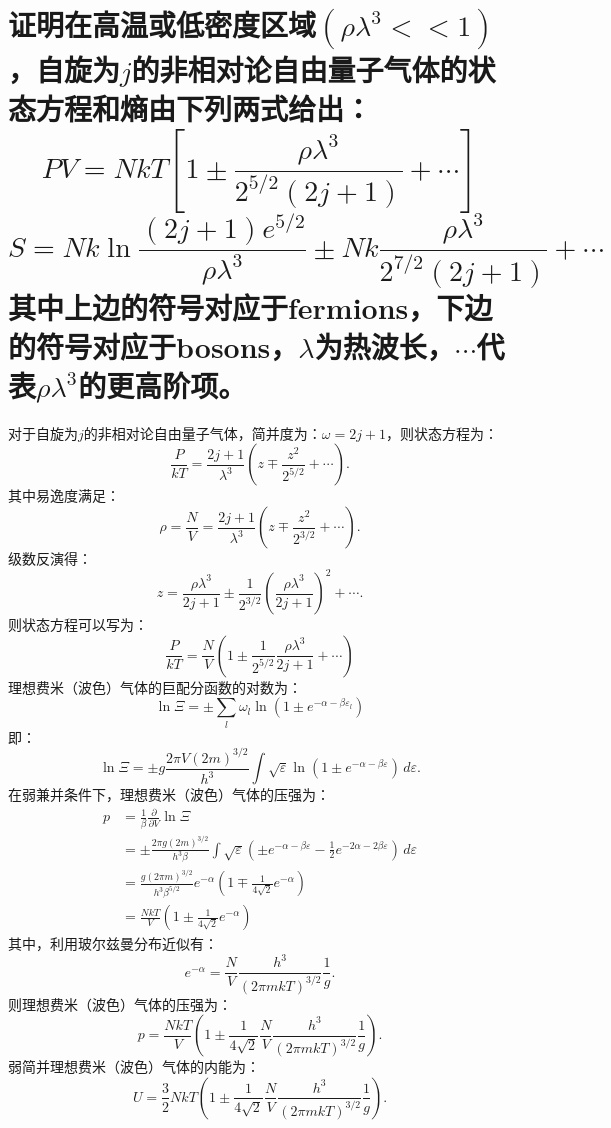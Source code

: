 \documentclass[reqno,a4paper,12pt]{amsart}
\begin{document}
\section{证明在高温或低密度区域$(\rho\lambda^3 << 1)$，自旋为$j$的非相对论自由量子气体的状态方程和熵由下列两式给出：
\[
	PV = NkT\left[1 \pm \frac{\rho\lambda^3}{2^{5/2}(2j+1)} + \cdots \right]
\]
\[
	S = Nk\ln\frac{(2j+1)e^{5/2}}{\rho\lambda^3}\pm Nk\frac{\rho\lambda^3}{2^{7/2}(2j+1)} + \cdots
\]
其中上边的符号对应于fermions，下边的符号对应于bosons，$\lambda$为热波长，$\cdots$代表$\rho\lambda^3$的更高阶项。
}
\begin{tcolorbox}[breakable, colback = black!5!white, colframe = black]
对于自旋为$j$的非相对论自由量子气体，简并度为：$\omega = 2j+1$，则状态方程为：
\[
	\frac{P}{kT} = \frac{2j+1}{\lambda^3}\left( z \mp \frac{z^2}{2^{5/2}} + \cdots \right).
\]
其中易逸度满足：
\[
	\rho = \frac{N}{V} = \frac{2j+1}{\lambda^3}\left( z \mp \frac{z^2}{2^{3/2}} + \cdots \right).
\]
级数反演得：
\[
	z = \frac{\rho\lambda^3}{2j+1} \pm \frac{1}{2^{3/2}} \left( \frac{\rho\lambda^3}{2j+1} \right)^2 + \cdots.
\]
则状态方程可以写为：
\[
	\frac{P}{kT} = \frac{N}{V} \left( 1 \pm \frac{1}{2^{5/2}}\frac{\rho\lambda^3}{2j+1} + \cdots \right)
\]
理想费米（波色）气体的巨配分函数的对数为：
\[
	\ln \Xi = \pm \sum_l \omega_l \ln\left( 1 \pm e^{-\alpha-\beta\varepsilon_l} \right)
\]
即：
\[
	\ln \Xi = \pm g \frac{2\pi V (2m)^{3/2}}{h^3} \int \sqrt{\varepsilon} \ln\left( 1 \pm e^{-\alpha-\beta\varepsilon} \right)\,d\varepsilon .
\]
在弱兼并条件下，理想费米（波色）气体的压强为：
\begin{align*}
	p &= \frac{1}{\beta}\frac{\partial}{\partial V}\ln \Xi \\
	&= \pm \frac{2\pi g(2m)^{3/2}}{h^3\beta} \int \sqrt{\varepsilon} \left( \pm e^{-\alpha-\beta\varepsilon} - \frac{1}{2}e^{-2\alpha-2\beta\varepsilon} \right) \,d\varepsilon \\
	&= \frac{g(2\pi m)^{3/2}}{h^3\beta^{5/2}} e^{-\alpha} \left( 1 \mp \frac{1}{4\sqrt{2}}e^{-\alpha} \right) \\
	&= \frac{NkT}{V} \left( 1 \pm \frac{1}{4\sqrt{2}}e^{-\alpha} \right)
\end{align*}
其中，利用玻尔兹曼分布近似有：
\[
	e^{-\alpha} = \frac{N}{V} \frac{h^3}{(2\pi m kT)^{3/2}} \frac{1}{g}.
\]
则理想费米（波色）气体的压强为：
\[
	p = \frac{NkT}{V} \left( 1 \pm \frac{1}{4\sqrt{2}}\frac{N}{V} \frac{h^3}{(2\pi m kT)^{3/2}} \frac{1}{g} \right).
\]
弱简并理想费米（波色）气体的内能为：
\[
	U = \frac{3}{2}NkT\left( 1 \pm \frac{1}{4\sqrt{2}}\frac{N}{V} \frac{h^3}{(2\pi m kT)^{3/2}} \frac{1}{g} \right).
\]
\end{tcolorbox}
\end{document}
